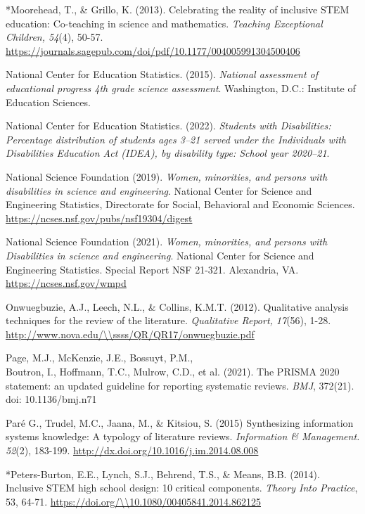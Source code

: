 \documentclass[11pt]{sig-alternate}
\begin{document}
\begin{large}
*Moorehead, T., \& Grillo, K. (2013). Celebrating the reality of inclusive STEM education: Co-teaching in science and mathematics. \textit{Teaching Exceptional Children, 54}(4), 50-57. \url{https://journals.sagepub.com/doi/pdf/10.1177/004005991304500406}

National Center for Education Statistics. (2015).\textit{ National assessment of educational progress 4th grade science assessment}. Washington, D.C.: Institute of Education Sciences.

National Center for Education Statistics. (2022).\textit{ Students with Disabilities: Percentage distribution of students ages 3–21 served under the Individuals with Disabilities Education Act (IDEA), by disability type: School year 2020–21}.

National Science Foundation (2019).\textit{ Women, minorities, and persons with disabilities in science and engineering}. National Center for Science and Engineering Statistics, Directorate for Social, Behavioral and Economic Sciences. \url{https://ncses.nsf.gov/pubs/nsf19304/digest}

National Science Foundation (2021).\textit{ Women, minorities, and persons with Disabilities in science and engineering}. National Center for Science and Engineering Statistics. Special Report NSF 21-321. Alexandria, VA. \url{https://ncses.nsf.gov/wmpd}

Onwuegbuzie, A.J., Leech, N.L., \& Collins, K.M.T. (2012). Qualitative analysis techniques for the review of the literature.\textit{ Qualitative Report, 17}(56), 1-28. \url{http://www.nova.edu/\\ssss/QR/QR17/onwuegbuzie.pdf}

Page, M.J., McKenzie, J.E., Bossuyt, P.M., \\Boutron, I., Hoffmann, T.C., Mulrow, C.D., et al. (2021). The PRISMA 2020 statement: an updated guideline for reporting systematic reviews. \textit{BMJ}, 372(21). doi: 10.1136/bmj.n71

Paré G., Trudel, M.C., Jaana, M., \& Kitsiou, S. (2015) Synthesizing information systems knowledge: A typology of literature reviews.\textit{ Information \& Management. 52}(2), 183-199. \url{http://dx.doi.org/10.1016/j.im.2014.08.008}

*Peters-Burton, E.E., Lynch, S.J., Behrend, T.S., \& Means, B.B. (2014). Inclusive STEM high school design: 10 critical components. \textit{Theory Into Practice}, 53, 64-71. \url{https://doi.org/\\10.1080/00405841.2014.862125}


\end{large}
\end{document}
